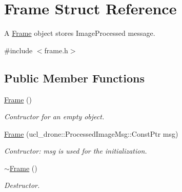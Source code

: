 \hypertarget{structFrame}{}\section{Frame Struct Reference}
\label{structFrame}


A \hyperlink{structFrame}{Frame} object stores Image\+Processed message.  




{\ttfamily \#include $<$frame.\+h$>$}

\subsection*{Public Member Functions}
\begin{DoxyCompactItemize}
\item 
\mbox{\label{structFrame_ad2e5946cf41d4817e750500acf05d02b}} 
\hyperlink{structFrame_ad2e5946cf41d4817e750500acf05d02b}{Frame} ()
\begin{DoxyCompactList}\small\item\em Contructor for an empty object. \end{DoxyCompactList}\item 
\mbox{\label{structFrame_add2e167df3a42e48e9e74a696167cdbb}} 
\hyperlink{structFrame_add2e167df3a42e48e9e74a696167cdbb}{Frame} (ucl\+\_\+drone\+::\+Processed\+Image\+Msg\+::\+Const\+Ptr msg)
\begin{DoxyCompactList}\small\item\em Contructor\+: msg is used for the initialization. \end{DoxyCompactList}\item 
\mbox{\label{structFrame_abec8c7bccdfc88cb4da137caae9f73d6}} 
\hyperlink{structFrame_abec8c7bccdfc88cb4da137caae9f73d6}{$\sim$\+Frame} ()
\begin{DoxyCompactList}\small\item\em Destructor. \end{DoxyCompactList}\end{DoxyCompactItemize}
